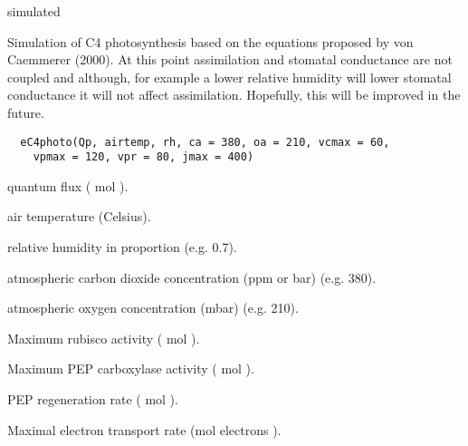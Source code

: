 \documentclass[letterpaper]{book}
\begin{document}
%
\begin{Source}\relax
simulated
\end{Source}
%
\begin{Description}\relax
Simulation of C4 photosynthesis based on the equations
proposed by von Caemmerer (2000).  At this point
assimilation and stomatal conductance are not coupled and
although, for example a lower relative humidity will
lower stomatal conductance it will not affect
assimilation.  Hopefully, this will be improved in the
future.
\end{Description}
%
\begin{Usage}
\begin{verbatim}
  eC4photo(Qp, airtemp, rh, ca = 380, oa = 210, vcmax = 60,
    vpmax = 120, vpr = 80, jmax = 400)
\end{verbatim}
\end{Usage}
%
\begin{Arguments}
\begin{ldescription}
\item[\code{Qp}] quantum flux (\eqn{\mu}{} mol
 ).

\item[\code{airtemp}] air temperature (Celsius).

\item[\code{rh}] relative humidity in proportion (e.g. 0.7).

\item[\code{ca}] atmospheric carbon dioxide concentration (ppm
or \eqn{\mu}{}bar) (e.g. 380).

\item[\code{oa}] atmospheric oxygen concentration (mbar) (e.g.
210).

\item[\code{vcmax}] Maximum rubisco activity (\eqn{\mu}{}
mol  ).

\item[\code{vpmax}] Maximum PEP carboxylase activity
(\eqn{\mu}{} mol 
).

\item[\code{vpr}] PEP regeneration rate (\eqn{\mu}{} mol
 ).

\item[\code{jmax}] Maximal electron transport rate
(\eqn{\mu}{}mol electrons 
).
\end{ldescription}
\end{Arguments}
\end{document}
